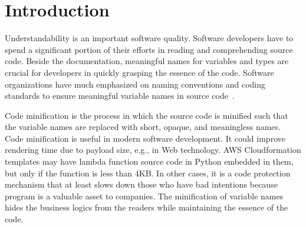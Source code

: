 \section{Introduction}
\label{intro:sec}

Understandability is an important software quality. Software
developers have to spend a significant portion of their efforts in
reading and comprehending source code. Beside the documentation,
meaningful names for variables and types are crucial for developers in
quickly grasping the essence of the code. Software organizations have
much emphasized on naming conventions and coding standards to ensure
meaningful variable names in source
code~\cite{barr-codeconvention-fse14}.



    Code minification is the process in which the source
    code is minified such that the variable names are replaced with
    short, opaque, and meaningless names. Code minification is useful
    in modern software development. It could improve rendering time
    due to payload size, e.g., in Web technology. AWS Cloudformation
    templates may have lambda function source code in Python embedded
    in them, but only if the function is less than 4KB. In other
    cases, it is a code protection mechanism that at least slows down
    those who have bad intentions because program is a valuable asset
    to companies. The minification of variable names hides the
    business logics from the readers while maintaining the essence of
    the code.




